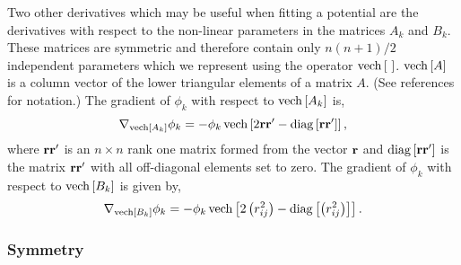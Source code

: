Two other derivatives which may be useful when fitting a potential are the
derivatives with respect to the non-linear parameters in the matrices $A_k$
and $B_k$. These matrices are symmetric and therefore contain only $n\left(
n+1\right) /2$ independent parameters which we represent using the operator $%
\mathop{\rm vech}%
\left[ \,\,\right] $. $%
\mathop{\rm vech}%
\left[ A\right] $ is a column vector of the lower triangular elements of a
matrix $A.$ (See references for notation.\cite{Kinghorn95a,Kinghorn95b}) The
gradient of $\phi _k$ with respect to $%
\mathop{\rm vech}%
\left[ A_k\right] $ is, 
\begin{equation}
\nabla _{%
\mathop{\rm vech}%
\left[ A_k\right] }\phi _k=-\phi _k%
\mathop{\rm vech}%
\left[ 2{\bf rr}^{\prime }-%
\mathop{\rm diag}%
\left[ {\bf rr}^{\prime }\right] \right] ,
\end{equation}
where ${\bf rr}^{\prime }$ is an $n\times n$ rank one matrix formed from the
vector ${\bf r}$ and $%
\mathop{\rm diag}%
\left[ {\bf rr}^{\prime }\right] $ is the matrix ${\bf rr}^{\prime }$ with
all off-diagonal elements set to zero. The gradient of $\phi _k$ with
respect to $%
\mathop{\rm vech}%
\left[ B_k\right] $ is given by, 
\begin{equation}
\nabla _{%
\mathop{\rm vech}%
\left[ B_k\right] }\phi _k=-\phi _k%
\mathop{\rm vech}%
\left[ 2\left( r_{ij}^2\right) -%
\mathop{\rm diag}%
\left[ \left( r_{ij}^2\right) \right] \right] .
\end{equation}

\subsubsection{Symmetry}

